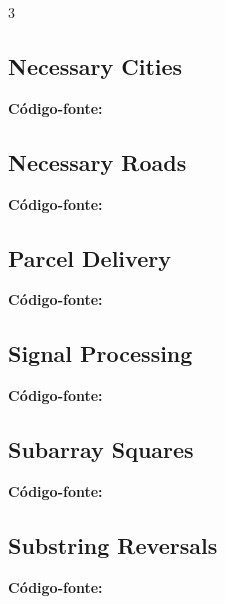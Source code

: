 \documentclass[8pt]{extarticle}
\begin{document}
\begin{multicols*}{3}
\subsection{Necessary Cities}
\begin{caixaenunciado}

\end{caixaenunciado}
\vspace{0.3cm}
\noindent\textbf{Código-fonte:}


\subsection{Necessary Roads}
\begin{caixaenunciado}

\end{caixaenunciado}
\vspace{0.3cm}
\noindent\textbf{Código-fonte:}


\subsection{Parcel Delivery}
\begin{caixaenunciado}

\end{caixaenunciado}
\vspace{0.3cm}
\noindent\textbf{Código-fonte:}


\subsection{Signal Processing}
\begin{caixaenunciado}

\end{caixaenunciado}
\vspace{0.3cm}
\noindent\textbf{Código-fonte:}


\subsection{Subarray Squares}
\begin{caixaenunciado}

\end{caixaenunciado}
\vspace{0.3cm}
\noindent\textbf{Código-fonte:}


\subsection{Substring Reversals}
\begin{caixaenunciado}

\end{caixaenunciado}
\vspace{0.3cm}
\noindent\textbf{Código-fonte:}

\end{multicols*}
\end{document}
